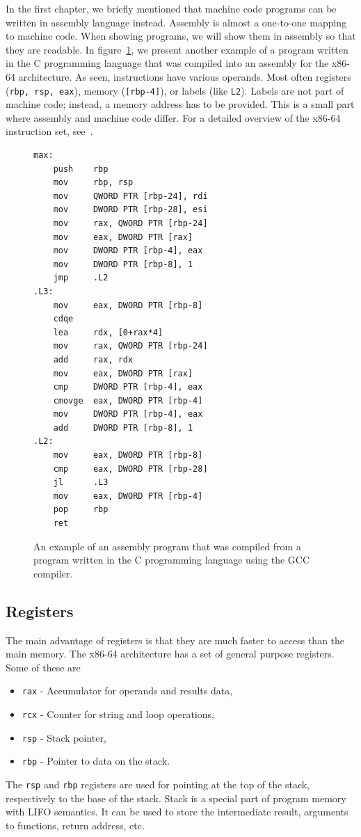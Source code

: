 In the first chapter, we briefly mentioned that machine code programs can be
written in assembly language instead. Assembly is almost a one-to-one mapping
to machine code. When showing programs, we will show them in assembly so that
they are readable. In figure~\ref{fig:assembly-example2}, we present another
example of a program written in the C programming language that was compiled
into an assembly for the x86-64 architecture. As seen, instructions have
various operands. Most often registers (\texttt{rbp, rsp, eax}), memory
(\texttt{[rbp-4]}), or labels (like \texttt{L2}). Labels are not part of
machine code; instead, a memory address has to be provided. This is a small
part where assembly and machine code differ. For a detailed overview of the
x86-64 instruction set, see~\cite{intel-manual}.

\begin{figure}
    \begin{lstlisting}
max:
    push    rbp
    mov     rbp, rsp
    mov     QWORD PTR [rbp-24], rdi
    mov     DWORD PTR [rbp-28], esi
    mov     rax, QWORD PTR [rbp-24]
    mov     eax, DWORD PTR [rax]
    mov     DWORD PTR [rbp-4], eax
    mov     DWORD PTR [rbp-8], 1
    jmp     .L2
.L3:
    mov     eax, DWORD PTR [rbp-8]
    cdqe
    lea     rdx, [0+rax*4]
    mov     rax, QWORD PTR [rbp-24]
    add     rax, rdx
    mov     eax, DWORD PTR [rax]
    cmp     DWORD PTR [rbp-4], eax
    cmovge  eax, DWORD PTR [rbp-4]
    mov     DWORD PTR [rbp-4], eax
    add     DWORD PTR [rbp-8], 1
.L2:
    mov     eax, DWORD PTR [rbp-8]
    cmp     eax, DWORD PTR [rbp-28]
    jl      .L3
    mov     eax, DWORD PTR [rbp-4]
    pop     rbp
    ret
    \end{lstlisting}
    \caption{An example of an assembly program that was compiled from a program
    written in the C programming language using the GCC compiler.}
    \label{fig:assembly-example2}
\end{figure}

\subsection*{Registers}\label{subsection:registers}

The main advantage of registers is that they are much faster to access than the
main memory. The x86-64 architecture has a set of general purpose registers.
Some of these are
\begin{itemize}
    \item \texttt{rax} - Accumulator for operands and results data,
    \item \texttt{rcx} - Counter for string and loop operations,
    \item \texttt{rsp} - Stack pointer,
    \item \texttt{rbp} - Pointer to data on the stack.
\end{itemize}
The \texttt{rsp} and \texttt{rbp} registers are used for pointing at the top of
the stack, respectively to the base of the stack. Stack is a special part of
program memory with LIFO semantics. It can be used to store the intermediate
result, arguments to functions, return address, etc.

